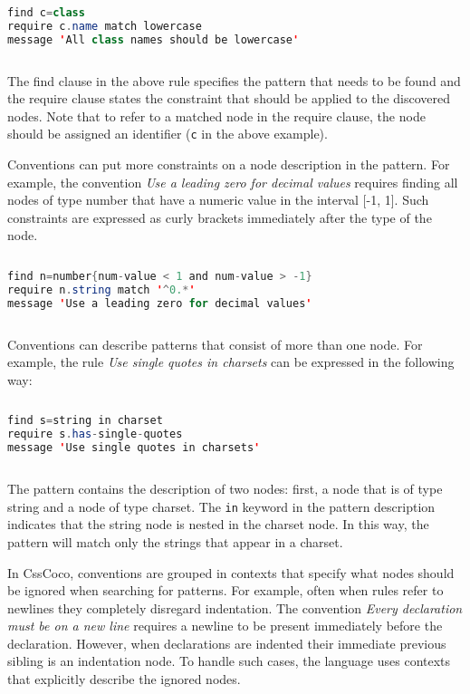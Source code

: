 \begin{sourcecode}
\begin{lstlisting}[style=mono,language=Java]
find c=class
require c.name match lowercase
message 'All class names should be lowercase'
\end{lstlisting}
\end{sourcecode}

The find clause in the above rule specifies the pattern that needs to be found and the require
clause states the constraint that should be applied to the discovered nodes. Note that to refer to a
matched node in the require clause, the node should be assigned an identifier (\texttt{c} in the
above example).

Conventions can put more constraints on a node description in the pattern. For example, the
convention \textit{Use a leading zero for decimal values} requires finding all nodes of type number
that have a numeric value in the interval [-1, 1]. Such constraints are expressed as curly brackets
immediately after the type of the node.

\begin{sourcecode}
\begin{lstlisting}[style=mono,language=Java]
find n=number{num-value < 1 and num-value > -1}
require n.string match '^0.*'
message 'Use a leading zero for decimal values'
\end{lstlisting}
\end{sourcecode}

Conventions can describe patterns that consist of more than one node. For example, the rule
\textit{Use single quotes in charsets} can be expressed in the following way:

\begin{sourcecode}
\begin{lstlisting}[style=mono,language=Java]
find s=string in charset
require s.has-single-quotes
message 'Use single quotes in charsets'
\end{lstlisting}
\end{sourcecode}

The pattern contains the description of two nodes: first, a node that is of type string and a node
of type charset. The \texttt{in} keyword in the pattern description indicates that the string node
is nested in the charset node. In this way, the pattern will match only the strings that appear in a
charset.

In CssCoco, conventions are grouped in contexts that specify what nodes should be ignored when
searching for patterns. For example, often when rules refer to newlines they completely disregard
indentation. The convention \textit{Every declaration must be on a new line} requires a newline to
be present immediately before the declaration. However, when declarations are indented their
immediate previous sibling is an indentation node. To handle such cases, the language uses contexts
that explicitly describe the ignored nodes.

